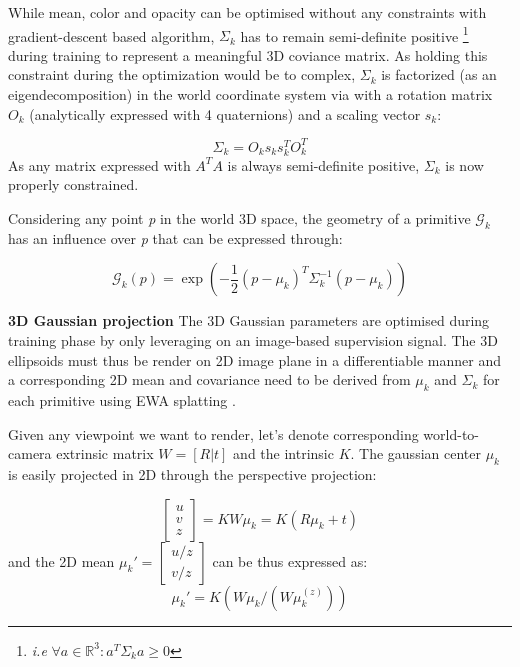 While mean, color and opacity can be optimised without any constraints with gradient-descent based algorithm, $\Sigma_{k}$ has to remain semi-definite positive \footnote{\textit{i.e} $ \forall a \in \mathbb{R}^{3}: a^{T}\Sigma_{k} a \geq 0$} during training to represent a meaningful 3D coviance matrix. As holding this constraint during the optimization would be to complex, $\Sigma_{k}$ is factorized (as an eigendecomposition) in the world coordinate system via with a rotation matrix $O_{k}$ (analytically expressed with 4 quaternions) and a scaling vector $s_{k}$: 

\begin{equation}
    \Sigma_{k} = O_{k}s_{k}s_{k}^{T}O_{k}^{T}
\end{equation}
As any matrix expressed with $A^{T}A$ is always semi-definite positive, $\Sigma_{k}$ is now properly constrained. 

Considering any point \textit{p} in the world 3D space, the geometry of a primitive $\mathcal{G}_{k}$ has an influence over \textit{p} that can be expressed through: 

\begin{equation}
  \mathcal{G}_{k}(p) = \exp(-\frac{1}{2}(p-\mu_{k})^{T}\Sigma_{k}^{-1}(p-\mu_{k}))
\end{equation}

\noindent \textbf{3D Gaussian projection} The 3D Gaussian parameters are optimised during training phase by only leveraging on an image-based supervision signal. The 3D ellipsoids must thus be render on 2D image plane in a differentiable manner and a corresponding 2D mean and covariance need to be derived from $\mu_{k}$ and $\Sigma_{k}$ for each primitive using EWA splatting \cite{zwicker2001ewa}. 

Given any viewpoint we want to render, let's denote corresponding world-to-camera extrinsic matrix $W=[R|t]$ and the intrinsic $K$. The gaussian center $\mu_{k}$ is easily projected in 2D through the perspective projection: 

\begin{equation}
  \begin{bmatrix}
    u \\
    v \\
    z
  \end{bmatrix} = KW\mu_{k} = K(R\mu_{k}+t)
\end{equation}
and the 2D mean $\mu_{k}' = \begin{bmatrix}
  u/z \\
  v/z
\end{bmatrix}$ can be  thus expressed as:
\begin{equation}
  \mu_{k}' = K(W\mu_{k}/(W\mu_{k}^{(z)}))
\end{equation}

